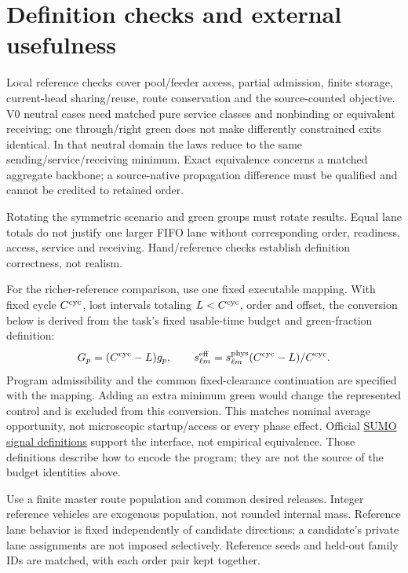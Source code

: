 \documentclass[10pt,a4paper]{article}
\begin{document}
\section{Definition checks and external usefulness}

Local reference checks cover pool/feeder access, partial admission,
finite storage, current-head
sharing/reuse, route conservation and the source-counted objective.
V0 neutral cases need matched pure service classes and nonbinding or
equivalent receiving; one through/right green does not make differently
constrained exits identical. In that neutral domain the laws reduce to
the same sending/service/receiving minimum. Exact equivalence concerns
a matched aggregate backbone; a source-native propagation difference
must be qualified and cannot be credited to retained order.

Rotating the symmetric scenario and green groups must rotate results.
Equal lane totals do not justify one larger FIFO lane without
corresponding order, readiness, access, service and receiving.
Hand/reference checks establish definition correctness, not realism.

For the richer-reference comparison, use one fixed executable mapping. With fixed cycle
$C^{\rm cyc}$, lost intervals totaling $L<C^{\rm cyc}$, order and offset,
the conversion below is derived from the task's fixed usable-time budget and green-fraction definition:
\begin{equation}
 G_p=(C^{\rm cyc}-L)g_p,\qquad
 s^{\rm eff}_{\ell m}=s^{\rm phys}_{\ell m}
                         (C^{\rm cyc}-L)/C^{\rm cyc}.
 \label{eq:reference-action}
\end{equation}
Program admissibility and the common fixed-clearance continuation are
specified with the mapping. Adding an extra minimum green would change
the represented control and is excluded from this conversion.
This matches nominal average opportunity, not microscopic startup/access
or every phase effect. Official
\href{https://sumo.dlr.de/docs/Simulation/Traffic_Lights.html}
{SUMO signal definitions} support the interface, not empirical equivalence.
Those definitions describe how to encode the program; they are not the source of the budget identities above.

Use a finite master route population and common desired releases.
Integer reference vehicles are exogenous population, not rounded internal
mass. Reference lane behavior is fixed independently of candidate
directions; a candidate's private lane assignments are not imposed
selectively. Reference seeds and held-out family IDs are matched,
with each order pair kept together.
\end{document}
